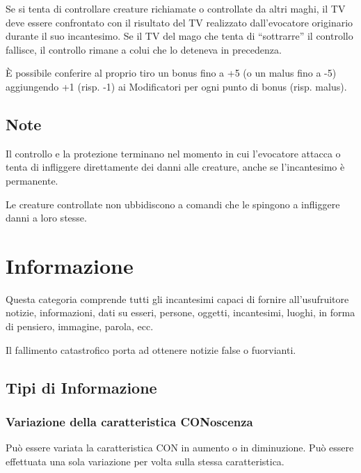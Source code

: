 Se si tenta di
controllare creature richiamate o controllate da altri maghi, il TV
deve essere confrontato con il risultato del TV realizzato
dall'evocatore originario durante il suo incantesimo. Se il TV del
mago che tenta di ``sottrarre'' il controllo fallisce, il controllo
rimane a colui che lo deteneva in precedenza.  

\`E possibile conferire al proprio tiro un bonus fino a +5 (o un malus
fino a -5) aggiungendo +1 (risp. -1) ai Modificatori per ogni punto di
bonus (risp. malus).

\subsection{Note}

Il controllo e la protezione terminano nel momento in cui l'evocatore
attacca o tenta di infliggere direttamente dei danni alle creature,
anche se l'incantesimo \`e permanente. 

Le creature controllate non ubbidiscono a comandi che le spingono a
infliggere danni a loro stesse.

\section{Informazione}

Questa categoria comprende tutti gli incantesimi capaci di fornire
all'usufruitore notizie, informazioni, dati su esseri, persone,
oggetti, incantesimi, luoghi, in forma di pensiero, immagine, parola,
ecc.

Il fallimento catastrofico porta ad ottenere notizie false o
fuorvianti.

\subsection{Tipi di Informazione} 

\iffullversion
\subsubsection{Variazione della caratteristica CONoscenza} 

Pu\`o essere variata la caratteristica CON in aumento o
in diminuzione. Pu\`o essere effettuata una sola variazione per
volta sulla stessa caratteristica.



\fi

